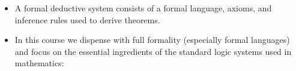 \documentclass[11pt,twoside]{report}
\begin{document}
\begin{itemize}

%
%

\item A formal deductive system consists of a formal language, axioms, and inference rules used to derive theorems. 

\item In this course we dispense with full formality  (especially  formal languages) and focus on the  essential ingredients of the standard logic systems used in mathematics: 


\end{itemize}
\end{document}
